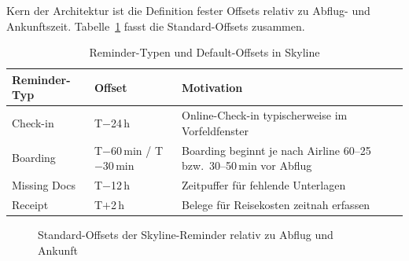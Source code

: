 Kern der Architektur ist die Definition fester Offsets relativ zu Abflug- und Ankunftszeit.
Tabelle~\ref{tab:reminder-offsets} fasst die Standard-Offsets zusammen.

\begin{table}[H]
  \centering
  \caption{Reminder-Typen und Default-Offsets in Skyline}
  \label{tab:reminder-offsets}
  \begin{tabularx}{\textwidth}{l l X}
    \toprule
    \textbf{Reminder-Typ} & \textbf{Offset} & \textbf{Motivation} \\
    \midrule
    Check-in     & T$-$24\,h            & Online-Check-in typischerweise im Vorfeldfenster
                                          \cite{lufthansaCheckin,lufthansaAutoCheckin} \\
    Boarding     & T$-$60\,min / T$-$30\,min & Boarding beginnt je nach Airline 60--25 bzw.\
                                          30--50\,min vor Abflug \cite{klmBoarding,aaBoarding} \\
    Missing Docs & T$-$12\,h            & Zeitpuffer für fehlende Unterlagen \\
    Receipt      & T$+$2\,h             & Belege für Reisekosten zeitnah erfassen
                                          \cite{mitSavingReceipts} \\
    \bottomrule
  \end{tabularx}
\end{table}

\begin{figure}[H]
  \centering
  \caption{Standard-Offsets der Skyline-Reminder relativ zu Abflug und Ankunft}
  \label{fig:reminder-timeline}
\end{figure}

